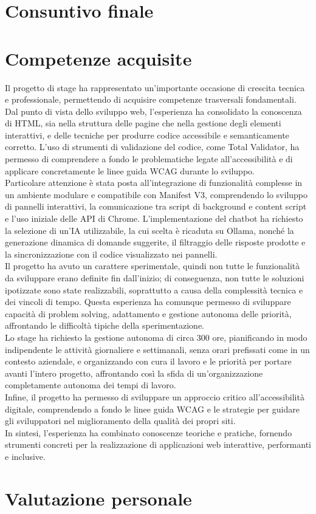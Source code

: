 \section{Consuntivo finale}
\noindent 

\section{Competenze acquisite}
\noindent Il progetto di stage ha rappresentato un’importante occasione di crescita tecnica e professionale, permettendo di acquisire competenze trasversali fondamentali. Dal punto di vista dello sviluppo web, l’esperienza ha consolidato la conoscenza di HTML, sia nella struttura delle pagine che nella gestione degli elementi interattivi, e delle tecniche per produrre codice accessibile e semanticamente corretto. L’uso di strumenti di validazione del codice, come Total Validator, ha permesso di comprendere a fondo le problematiche legate all’accessibilità e di applicare concretamente le linee guida WCAG durante lo sviluppo.\\
Particolare attenzione è stata posta all’integrazione di funzionalità complesse in un ambiente modulare e compatibile con Manifest V3, comprendendo lo sviluppo di pannelli interattivi, la comunicazione tra script di background e content script e l’uso iniziale delle API di Chrome. L’implementazione del chatbot ha richiesto la selezione di un’IA utilizzabile, la cui scelta è ricaduta su Ollama, nonché la generazione dinamica di domande suggerite, il filtraggio delle risposte prodotte e la sincronizzazione con il codice visualizzato nei pannelli.\\
Il progetto ha avuto un carattere sperimentale, quindi non tutte le funzionalità da sviluppare erano definite fin dall’inizio; di conseguenza, non tutte le soluzioni ipotizzate sono state realizzabili, soprattutto a causa della complessità tecnica e dei vincoli di tempo. Questa esperienza ha comunque permesso di sviluppare capacità di problem solving, adattamento e gestione autonoma delle priorità, affrontando le difficoltà tipiche della sperimentazione.\\
Lo stage ha richiesto la gestione autonoma di circa 300 ore, pianificando in modo indipendente le attività giornaliere e settimanali, senza orari prefissati come in un contesto aziendale, e organizzando con cura il lavoro e le priorità per portare avanti l’intero progetto, affrontando così la sfida di un’organizzazione completamente autonoma dei tempi di lavoro.\\
Infine, il progetto ha permesso di sviluppare un approccio critico all’accessibilità digitale, comprendendo a fondo le linee guida WCAG e le strategie per guidare gli sviluppatori nel miglioramento della qualità dei propri siti. 
\\In sintesi, l’esperienza ha combinato conoscenze teoriche e pratiche, fornendo strumenti concreti per la realizzazione di applicazioni web interattive, performanti e inclusive.

\section{Valutazione personale}